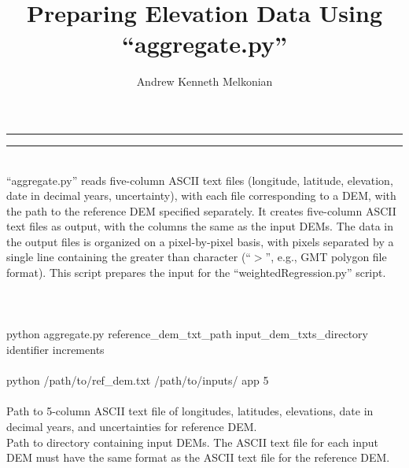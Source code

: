 \documentclass[12pt]{article}
\title{Preparing Elevation Data Using ``aggregate.py''}
\author{Andrew Kenneth Melkonian}
\begin{document}
\maketitle

\vspace{2pt}
\hrule
\vspace{6pt}
\vspace{6pt}
\hrule
\vspace{16pt}

 \\

\noindent ``aggregate.py'' reads five-column ASCII text files (longitude, latitude, elevation, date in decimal years, uncertainty), with each file corresponding to a DEM, with the path to the reference DEM specified separately.
It creates five-column ASCII text files as output, with the columns the same as the input DEMs.
The data in the output files is organized on a pixel-by-pixel basis, with pixels separated by a single line containing the greater than character (``$>$'', e.g., GMT polygon file format).
This script prepares the input for the ``weightedRegression.py'' script. \\

 \\

 \\

 \\

\noindent python aggregate.py reference\_dem\_txt\_path input\_dem\_txts\_directory identifier increments \\

 \\

\noindent python /path/to/ref\_dem.txt /path/to/inputs/ app 5 \\

 \\

 Path to 5-column ASCII text file of longitudes, latitudes, elevations, date in decimal years, and uncertainties for reference DEM. \\

 Path to directory containing input DEMs. The ASCII text file for each input DEM must have the same format as the ASCII text file for the reference DEM. \\
\end{document}
